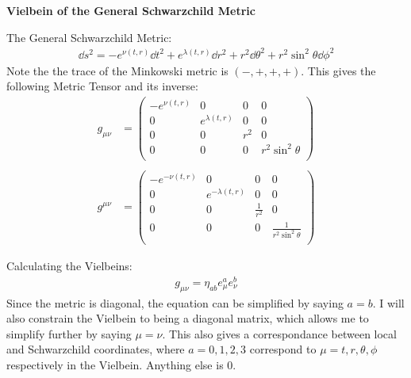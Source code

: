 \documentclass[12pt]{article}
\begin{document}
\begin{center}
  \Large\textbf{Vielbein of the General Schwarzchild Metric} \\
  \large{}
\end{center}

The General Schwarzchild Metric:
\begin{align}
  \dd{s^2} = -e^{\nu(t,r)}\dd{t^2} + e^{\lambda(t,r)}\dd{r^2} + r^2\dd{\theta^2} + r^2\sin^2{\theta}\dd{\phi^2}
\end{align}
Note the the trace of the Minkowski metric is $(-,+,+,+)$. This gives the following Metric Tensor and its inverse:
\begin{align}
  g_{\mu\nu} &= 
  \begin{pmatrix}
    -e^{\nu(t,r)} & 0 & 0 & 0 \\
    0 & e^{\lambda(t,r)} & 0 & 0 \\
    0 & 0 & r^2 & 0 \\
    0 & 0 & 0 & r^2\sin^2{\theta} \\
  \end{pmatrix} \\ \nonumber \\
  g^{\mu\nu} &= 
  \begin{pmatrix}
    -e^{-\nu(t,r)} & 0 & 0 & 0 \\
    0 & e^{-\lambda(t,r)} & 0 & 0 \\
    0 & 0 & \frac{1}{r^2} & 0 \\
    0 & 0 & 0 & \frac{1}{r^2\sin^2{\theta}} \\
  \end{pmatrix}
\end{align}

Calculating the Vielbeins:
\begin{align}
  g_{\mu\nu} = \eta_{ab}e^a_\mu e^b_\nu
\end{align}
Since the metric is diagonal, the equation can be simplified by saying $a=b$. I will also constrain the Vielbein to being a diagonal matrix, which allows me to simplify further by saying $\mu = \nu$. This also gives a correspondance between local and Schwarzchild coordinates, where $a = 0,1,2,3$ correspond to $\mu = t,r,\theta,\phi$ respectively in the Vielbein. Anything else is $0$.
\end{document}
